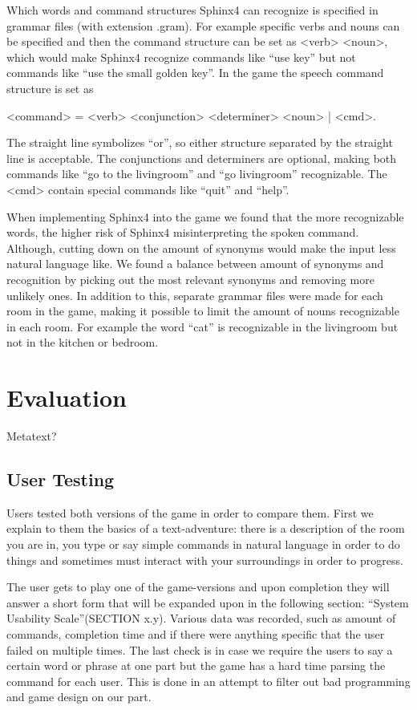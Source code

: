 Which words and command structures Sphinx4 can recognize is specified in grammar files (with extension .gram). For example specific verbs and nouns can be specified and then the command structure can be set as <verb> <noun>, which would make Sphinx4 recognize commands like ``use key'' but not commands like ``use the small golden key''. In the game the speech command structure is set as

<command> = <verb> <conjunction> <determiner> <noun> | <cmd>.

The straight line symbolizes ``or'', so either structure separated by the straight line is acceptable. The conjunctions and determiners are optional, making both commands like ``go to the livingroom'' and ``go livingroom'' recognizable. The <cmd> contain special commands like ``quit'' and ``help''.

When implementing Sphinx4 into the game we found that the more recognizable words, the higher risk of Sphinx4 misinterpreting the spoken command. Although, cutting down on the amount of synonyms would make the input less natural language like. We found a balance between amount of synonyms and recognition by picking out the most relevant synonyms and removing more unlikely ones. In addition to this, separate grammar files were made for each room in the game, making it possible to limit the amount of nouns recognizable in each room. For example the word ``cat'' is recognizable in the livingroom but not in the kitchen or bedroom.

\section{Evaluation}
Metatext?

\subsection{User Testing}
Users tested both versions of the game in order to compare them. First we explain to them the basics of a text-adventure: there is a description of the room you are in, you type or say simple commands in natural language in order to do things and sometimes must interact with your surroundings in order to progress. 

The user gets to play one of the game-versions and upon completion they will answer a short form that will be expanded upon in the following section: “System Usability Scale”(SECTION x.y). Various data was recorded, such as amount of commands, completion time and if there were anything specific that the user failed on multiple times. The last check is in case we require the users to say a certain word or phrase at one part but the game has a hard time parsing the command for each user. This is done in an attempt to filter out bad programming and game design on our part.

